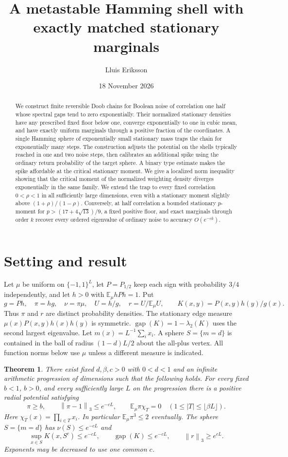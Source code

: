 \documentclass[11pt]{article}
\title{A metastable Hamming shell with exactly matched stationary marginals}
\author{Lluis Eriksson}
\date{18 November 2026}
\newtheorem{theorem}{Theorem}[section]
\newcommand{\E}{\mathbb E}
\newcommand{\norm}[1]{\left\|#1\right\|}
\begin{document}
\maketitle
\begin{abstract}
We construct finite reversible Doob chains for Boolean noise of correlation one half whose spectral gaps tend to zero exponentially. Their normalized stationary densities have any prescribed fixed floor below one, converge exponentially to one in cubic mean, and have exactly uniform marginals through a positive fraction of the coordinates. A single Hamming sphere of exponentially small stationary mass traps the chain for exponentially many steps. The construction adjusts the potential on the shells typically reached in one and two noise steps, then calibrates an additional spike using the ordinary return probability of the target sphere. A binary type estimate makes the spike affordable at the critical stationary moment. We give a localized norm inequality showing that the critical moment of the normalized weighting density diverges exponentially in the same family. We extend the trap to every fixed correlation \(0<\rho<1\) in all sufficiently large dimensions, even with a stationary moment slightly above \((1+\rho)/(1-\rho)\). Conversely, at half correlation a bounded stationary \(p\)-moment for \(p>(17+4\sqrt{13})/9\), a fixed positive floor, and exact marginals through order \(k\) recover every ordered eigenvalue of ordinary noise to accuracy \(O(e^{-ck})\).
\end{abstract}

\section{Setting and result}
Let $\mu$ be uniform on $\{-1,1\}^L$, let $P=P_{1/2}$ keep each sign with probability $3/4$ independently, and let $h>0$ with $\E_\mu hPh=1$. Put
\[
 g=Ph,\quad \pi=hg,\quad \nu=\pi\mu,\quad U=h/g,\quad r=U/\E_\mu U,
 \qquad K(x,y)=P(x,y)h(y)/g(x).
\]
Thus $\pi$ and $r$ are distinct probability densities. The stationary edge measure $\mu(x)P(x,y)h(x)h(y)$ is symmetric. $\operatorname{gap}(K)=1-\lambda_2(K)$ uses the second largest eigenvalue. Let $m(x)=L^{-1}\sum_i x_i$. A sphere $S=\{m=d\}$ is contained in the ball of radius $(1-d)L/2$ about the all-plus vertex. All function norms below use $\mu$ unless a different measure is indicated.

\begin{theorem}\label{main}
There exist fixed $d,\beta,c>0$ with $0<d<1$ and an infinite arithmetic progression of dimensions such that the following holds. For every fixed $b<1$, $b>0$, and every sufficiently large $L$ on the progression there is a positive radial potential satisfying
\[
 \pi\ge b,\qquad \norm{\pi-1}_3\le e^{-cL},\qquad
 \E_\mu\pi\chi_T=0\quad (1\le |T|\le\lfloor\beta L\rfloor).
\]
Here $\chi_T(x)=\prod_{i\in T}x_i$. In particular $\E_\mu\pi^3\le2$ eventually. The sphere $S=\{m=d\}$ has $\nu(S)\le e^{-cL}$ and
\[
 \sup_{x\in S}K(x,S^c)\le e^{-cL},\qquad
 \operatorname{gap}(K)\le e^{-cL},\qquad \norm{r}_3\ge e^{cL}.
\]
Exponents may be decreased to use one common $c$.
\end{theorem}
\end{document}
